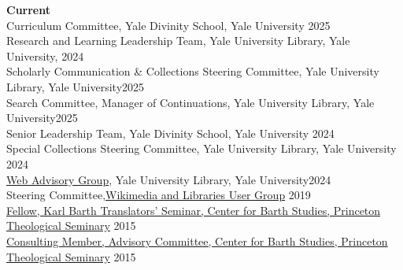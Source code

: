 \documentclass[]{res} %
\begin{document}
\begin{resume}
\vspace{8pt} %

{\bf Current} \\
Curriculum Committee, Yale Divinity School, Yale University \hfill 2025\\
Research and Learning Leadership Team, Yale University Library, Yale University, \hfill 2024\\
Scholarly Communication \& Collections Steering Committee, Yale University Library, Yale University\hfill 2025\\
Search Committee, Manager of Continuations, Yale University Library, Yale University\hfill 2025\\
Senior Leadership Team, Yale Divinity School, Yale University \hfill 2024\\
Special Collections Steering Committee, Yale University Library, Yale University \hfill 2024\\
\href{https://web.library.yale.edu/committees/web-advisory-group}{Web Advisory Group}, Yale University Library, Yale University\hfill 2024\\
Steering Committee,\href{https://meta.wikimedia.org/wiki/Wikimedia_and_Libraries_User_Group}{Wikimedia and Libraries User Group} \hfill 2019\\ 
\href{http://barth.ptsem.edu/event/translators-seminar}{Fellow, Karl Barth Translators’ Seminar, Center for Barth Studies, Princeton Theological Seminary} \hfill 2015\\
\href{http://barth.ptsem.edu/about-cbs/the-advisory-committee}{Consulting Member, Advisory Committee, Center for Barth Studies, Princeton Theological Seminary}  \hfill 2015\\


\end{resume}
\end{document}
